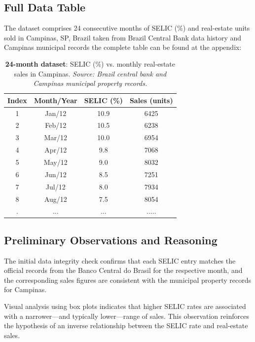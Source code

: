 \documentclass{article}
\begin{document}
\subsection{Full Data Table}

The dataset comprises 24 consecutive months of SELIC (\%) and real-estate units sold in Campinas, SP, Brazil taken from Brazil Central Bank data history and Campinas municipal records the complete table can be found at the appendix:

\begin{table}[H]
\centering
\begin{tabular}{cccc}
\toprule
\textbf{Index} & \textbf{Month/Year} & \textbf{SELIC (\%)} & \textbf{Sales (units)} \\
\midrule
1  & Jan/12 & 10.9 & 6425\\
2  & Feb/12 & 10.5 & 6238\\
3  & Mar/12 & 10.0 & 6954\\
4  & Apr/12 & 9.8  & 7068\\
5  & May/12 & 9.0  & 8032\\
6  & Jun/12 & 8.5  & 7251\\
7  & Jul/12 & 8.0  & 7934\\
8  & Aug/12 & 7.5  & 8054\\
.  & ... & ... & .....\\

\bottomrule
\end{tabular}
\caption{\textbf{24-month dataset}: SELIC (\%) vs. monthly real-estate sales in Campinas. \emph{Source: Brazil central bank and Campinas municipal property records.}}
\label{tab:dataset24}
\end{table}

\subsection{Preliminary Observations and Reasoning}

The initial data integrity check confirms that each SELIC entry matches the official records from the Banco Central do Brasil for the respective month, and the corresponding sales figures are consistent with the municipal property records for Campinas.

Visual analysis using box plots indicates that higher SELIC rates are associated with a narrower—and typically lower—range of sales. This observation reinforces the hypothesis of an inverse relationship between the SELIC rate and real-estate sales.
\end{document}
